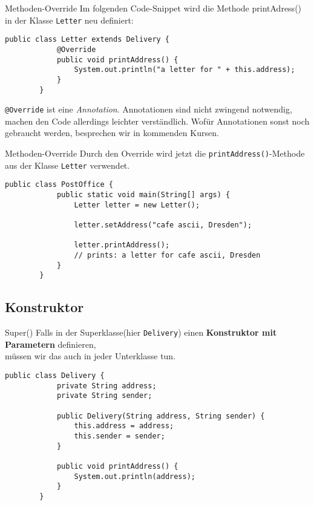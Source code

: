 \begin{frame}[fragile]{Methoden-Override}
    Im folgenden Code-Snippet wird die Methode printAdress() in der Klasse \texttt{Letter} neu definiert:
    \begin{lstlisting}[gobble=8]
        public class Letter extends Delivery {
            @Override
            public void printAddress() {
                System.out.println("a letter for " + this.address);    
            }	
        }
	\end{lstlisting}
    \pause
    \texttt{@Override} ist eine \textit{Annotation}.
    Annotationen sind nicht zwingend notwendig, machen den Code allerdings leichter verständlich.
    Wofür Annotationen sonst noch gebraucht werden, besprechen wir in kommenden Kursen.
\end{frame}
\begin{frame}[fragile]{Methoden-Override}
	Durch den Override wird jetzt die \texttt{printAddress()}-Methode aus der Klasse \texttt{Letter} verwendet.
    \begin{lstlisting}[gobble=8]
        public class PostOffice {
            public static void main(String[] args) {
                Letter letter = new Letter();
                
                letter.setAddress("cafe ascii, Dresden");
                
                letter.printAddress();
                // prints: a letter for cafe ascii, Dresden
            }	
        }
	\end{lstlisting}
\end{frame}

\subsection{Konstruktor}
\begin{frame}[fragile]{Super()}
	Falls in der Superklasse(hier \texttt{Delivery}) einen \textbf{Konstruktor mit Parametern} definieren, \\
    müssen wir das auch in jeder Unterklasse tun.
    \begin{lstlisting}[gobble=8]
        public class Delivery {
            private String address;
            private String sender;
            
            public Delivery(String address, String sender) {
                this.address = address;
                this.sender = sender;
            }
                    
            public void printAddress() {
                System.out.println(address);
            }
        }
	\end{lstlisting}
\end{frame}

